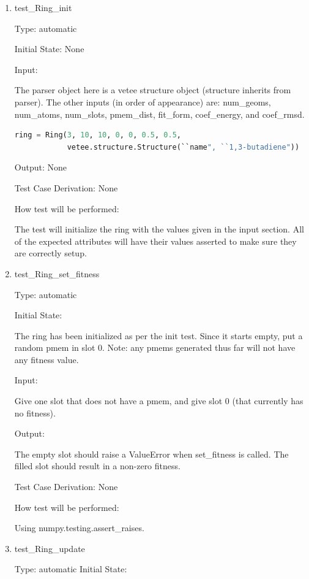 \documentclass[12pt, titlepage]{article}
\begin{document}
\begin{enumerate}
	
\item{test\_Ring\_init\\}

Type: automatic

Initial State: None

Input: 

The parser object here is a vetee structure object (structure inherits from 
parser). The other inputs (in order of appearance) are: num\_geoms, num\_atoms, 
num\_slots, pmem\_dist, fit\_form, coef\_energy, and coef\_rmsd.

\begin{lstlisting}[language=python, showstringspaces=false]
ring = Ring(3, 10, 10, 0, 0, 0.5, 0.5,
            vetee.structure.Structure(``name", ``1,3-butadiene"))
\end{lstlisting}
Output: None

Test Case Derivation: None

How test will be performed:

The test will initialize the ring with the values given in the input section. 
All of the expected attributes will have their values asserted to make sure 
they are correctly setup.

\item{test\_Ring\_set\_fitness\\}

Type: automatic

Initial State: 

The ring has been initialized as per the init test. Since it starts empty, put 
a random pmem in slot 0. Note: any pmems generated thus far will not have any 
fitness value.

Input: 

Give one slot that does not have a pmem, and give slot 0 (that currently has no 
fitness).

Output:

The empty slot should raise a ValueError when set\_fitness is called. The 
filled slot should result in a non-zero fitness.

Test Case Derivation: None

How test will be performed:

Using numpy.testing.assert\_raises. 

\item{test\_Ring\_update\\}

Type: automatic
Initial State:


\end{enumerate}
\end{document}
